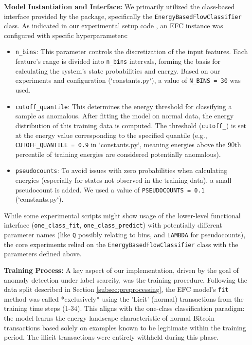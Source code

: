 \documentclass[12pt]{article}
\begin{document}
\textbf{Model Instantiation and Interface:} We primarily utilized the class-based interface provided by the package,
specifically the \texttt{EnergyBasedFlowClassifier} class. As indicated in our experimental setup code \cite{reproducibility},
an EFC instance was configured with specific hyperparameters:

\begin{itemize}
    \item \texttt{n\_bins}: This parameter controls the discretization of the input features. Each feature's range is
      divided into \texttt{n\_bins} intervals, forming the basis for calculating the system's state probabilities and
      energy. Based on our experiments and configuration (`constants.py`), a value of \texttt{N\_BINS = 30} was used.
    \item \texttt{cutoff\_quantile}: This determines the energy threshold for classifying a sample as anomalous. After
      fitting the model on normal data, the energy distribution of this training data is computed. The threshold
      (\texttt{cutoff\_}) is set at the energy value corresponding to the specified quantile
      (e.g., \texttt{CUTOFF\_QUANTILE = 0.9} in `constants.py`, meaning energies above the 90th percentile of training
      energies are considered potentially anomalous).
    \item \texttt{pseudocounts}: To avoid issues with zero probabilities when calculating energies (especially for states 
      not observed in the training data), a small pseudocount is added. We used a value of \texttt{PSEUDOCOUNTS = 0.1}
      (`constants.py`).
\end{itemize}

While some experimental scripts might show usage of the lower-level functional interface
(\texttt{one\_class\_fit}, \texttt{one\_class\_predict}) with potentially different parameter names (like \texttt{Q}
possibly relating to bins, and \texttt{LAMBDA} for pseudocounts), the core experiments relied on the
\texttt{EnergyBasedFlowClassifier} class with the parameters defined above.

\textbf{Training Process:} A key aspect of our implementation, driven by the goal of anomaly detection under label scarcity,
was the training procedure. Following the data split described in Section \ref{subsec:preprocessing}, the EFC model's
\texttt{fit} method was called *exclusively* using the 'Licit' (normal) transactions from the training time steps (1-34).
This aligns with the one-class classification paradigm: the model learns the energy landscape characteristic of normal
Bitcoin transactions based solely on examples known to be legitimate within the training period. The illicit transactions
were entirely withheld during this phase.
\end{document}
